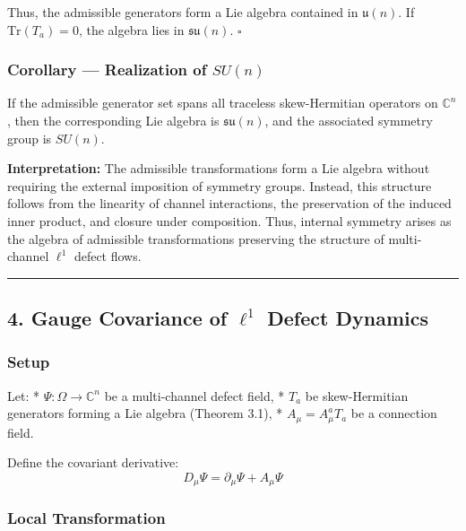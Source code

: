 \documentclass[
]{article}
\begin{document}
Thus, the admissible generators form a Lie algebra contained in
\(\mathfrak{u}(n)\). If \(\mathrm{Tr}(T_a)=0\), the algebra lies in
\(\mathfrak{su}(n)\). \(\square\)

\subsubsection{\texorpdfstring{Corollary --- Realization of
\(SU(n)\)}{Corollary --- Realization of SU(n)}}\label{corollary-realization-of-sun-1}

If the admissible generator set spans all traceless skew-Hermitian
operators on \(\mathbb{C}^n\), then the corresponding Lie algebra is
\(\mathfrak{su}(n)\), and the associated symmetry group is \(SU(n)\).

\textbf{Interpretation:} The admissible transformations form a Lie
algebra without requiring the external imposition of symmetry groups.
Instead, this structure follows from the linearity of channel
interactions, the preservation of the induced inner product, and closure
under composition. Thus, internal symmetry arises as the algebra of
admissible transformations preserving the structure of multi-channel
\(\ell^1\) defect flows.

\begin{center}\rule{0.5\linewidth}{0.5pt}\end{center}

\subsection{\texorpdfstring{4. Gauge Covariance of \(\ell^1\) Defect
Dynamics}{4. Gauge Covariance of \textbackslash ell\^{}1 Defect Dynamics}}\label{gauge-covariance-of-ell1-defect-dynamics-1}

\subsubsection{Setup}\label{setup-4}

Let: * \(\Psi : \Omega \to \mathbb{C}^n\) be a multi-channel defect
field, * \(T_a\) be skew-Hermitian generators forming a Lie algebra
(Theorem 3.1), * \(A_\mu = A_\mu^a T_a\) be a connection field.

Define the covariant derivative:
\[ D_\mu \Psi = \partial_\mu \Psi + A_\mu \Psi \]

\subsubsection{Local Transformation}\label{local-transformation-1}
\end{document}
